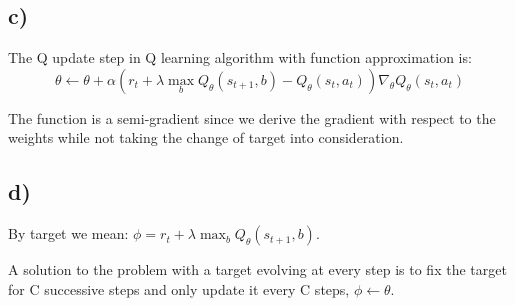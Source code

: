 \documentclass{article}
\begin{document}
\subsection*{c)}


The Q update step in Q learning algorithm with function approximation is:
\begin{equation}
    \theta \leftarrow \theta+\alpha\left(r_{t}+\lambda \max _{b} Q_{\theta}\left(s_{t+1}, b\right)-Q_{\theta}\left(s_{t}, a_{t}\right)\right) \nabla_{\theta} Q_{\theta}\left(s_{t}, a_{t}\right)
\end{equation}

The function is a semi-gradient since we derive the gradient with respect to the weights while not taking the change of target into consideration.


\subsection*{d)}


By target we mean: $\phi = r_{t}+\lambda \max _{b} Q_{\theta}\left(s_{t+1}, b\right)$.




A solution to the problem with a target evolving at every step is to fix the target for C successive steps and only update it every C steps,  $\phi \leftarrow \theta$.
\end{document}
